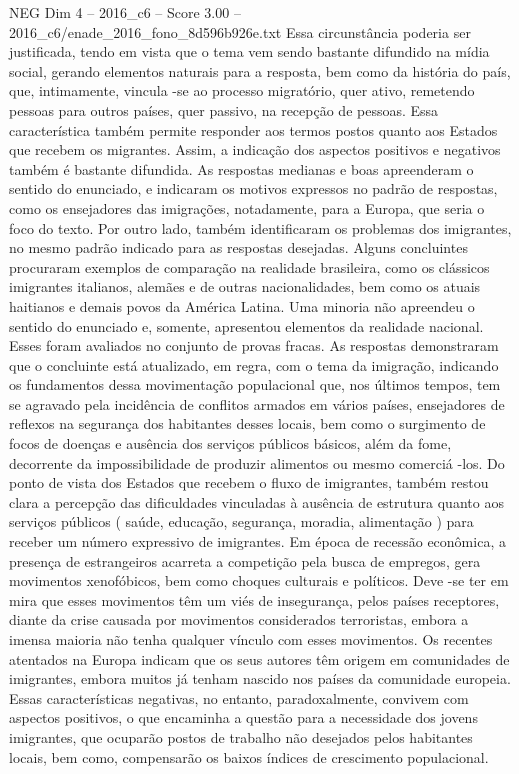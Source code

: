\begin{textsample}{NEG Dim 4 – 2016\_c6 – Score 3.00 – 2016\_c6/enade\_2016\_fono\_8d596b926e.txt}
Essa circunstância poderia ser justificada, tendo em vista que o tema vem sendo bastante difundido na mídia social, gerando elementos naturais para a resposta, bem como da história do país, que, intimamente, vincula -se ao processo migratório, quer ativo, remetendo pessoas para outros países, quer passivo, na recepção de pessoas.
Essa característica também permite responder aos termos postos quanto aos Estados que recebem os migrantes.
Assim, a indicação dos aspectos positivos e negativos também é bastante difundida.
As respostas medianas e boas apreenderam o sentido do enunciado, e indicaram os motivos expressos no padrão de respostas, como os ensejadores das imigrações, notadamente, para a Europa, que seria o foco do texto.
Por outro lado, também identificaram os problemas dos imigrantes, no mesmo padrão indicado para as respostas desejadas.
Alguns concluintes procuraram exemplos de comparação na realidade brasileira, como os clássicos imigrantes italianos, alemães e de outras nacionalidades, bem como os atuais haitianos e demais povos da América Latina.
Uma minoria não apreendeu o sentido do enunciado e, somente, apresentou elementos da realidade nacional.
Esses foram avaliados no conjunto de provas fracas.
As respostas demonstraram que o concluinte está atualizado, em regra, com o tema da imigração, indicando os fundamentos dessa movimentação populacional que, nos últimos tempos, tem se agravado pela incidência de conflitos armados em vários países, ensejadores de reflexos na segurança dos habitantes desses locais, bem como o surgimento de focos de doenças e ausência dos serviços públicos básicos, além da fome, decorrente da impossibilidade de produzir alimentos ou mesmo comerciá -los.
Do ponto de vista dos Estados que recebem o fluxo de imigrantes, também restou clara a percepção das dificuldades vinculadas à ausência de estrutura quanto aos serviços públicos ( saúde, educação, segurança, moradia, alimentação ) para receber um número expressivo de imigrantes.
Em época de recessão econômica, a presença de estrangeiros acarreta a competição pela busca de empregos, gera movimentos xenofóbicos, bem como choques culturais e políticos.
Deve -se ter em mira que esses movimentos têm um viés de insegurança, pelos países receptores, diante da crise causada por movimentos considerados terroristas, embora a imensa maioria não tenha qualquer vínculo com esses movimentos.
Os recentes atentados na Europa indicam que os seus autores têm origem em comunidades de imigrantes, embora muitos já tenham nascido nos países da comunidade europeia.
Essas características negativas, no entanto, paradoxalmente, convivem com aspectos positivos, o que encaminha a questão para a necessidade dos jovens imigrantes, que ocuparão postos de trabalho não desejados pelos habitantes locais, bem como, compensarão os baixos índices de crescimento populacional.

\end{textsample}
